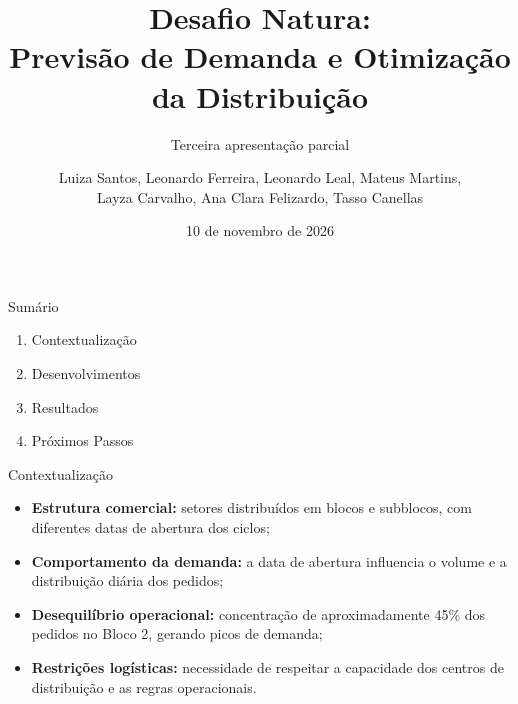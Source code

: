 \documentclass[aspectratio=169,11pt]{beamer}
\title[Desafio Natura]{
    Desafio Natura:\\
    Previsão de Demanda e Otimização da Distribuição
}
\subtitle{Terceira apresentação parcial}
\author[Equipe UNIFESP]{
    Luiza Santos, Leonardo Ferreira,
    Leonardo Leal, Mateus Martins,\\
    Layza Carvalho, Ana Clara Felizardo,
    Tasso Canellas
}
\institute{UNIFESP}
\date{10 de novembro de 2026}
\begin{document}
\begin{frame}
    \titlepage
\end{frame}


\begin{frame}{Sumário}

    \large

    \vspace{0.6cm}

    \begin{enumerate}
        \setlength{\itemsep}{1.1cm}

        \item Contextualização

        \item Desenvolvimentos

        \item Resultados

        \item Próximos Passos

    \end{enumerate}

\end{frame}



\begin{frame}{Contextualização}
    \small

    \begin{itemize}
        \setlength{\itemsep}{0.65cm}

        \item \textbf{Estrutura comercial:}
        setores distribuídos em blocos e subblocos,
        com diferentes datas de abertura dos ciclos;

        \item \textbf{Comportamento da demanda:}
        a data de abertura influencia o volume
        e a distribuição diária dos pedidos;

        \item \textbf{Desequilíbrio operacional:}
        concentração de aproximadamente 45\%
        dos pedidos no Bloco 2, gerando picos
        de demanda;

        \item \textbf{Restrições logísticas:}
        necessidade de respeitar a capacidade
        dos centros de distribuição e as
        regras operacionais.

    \end{itemize}

\end{frame}
\end{document}
